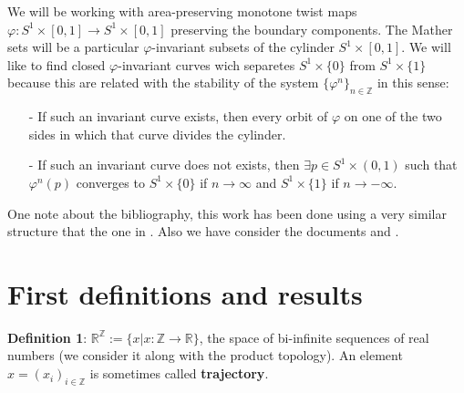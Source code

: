 \documentclass{article}
\begin{document}
	\noindent We will be working with area-preserving monotone twist maps $\varphi: S^{1} \times [0, 1] \rightarrow S^{1} \times [0, 1] $ preserving the boundary components. The Mather sets will be a particular $\varphi$-invariant subsets of the cylinder $S^{1} \times [0, 1]$. We will like to find closed $\varphi$-invariant curves wich separetes $S^{1} \times \{ 0 \}$ from $S^{1} \times \{ 1 \}$ because this are related with the stability of the system $\{ \varphi^{n} \}_{n \in \mathbb{Z}}$ in this sense:
	\begin{itemize}
		\item[-] If such an invariant curve exists, then every orbit of $\varphi$ on one of the two sides in which that curve divides the cylinder.
		\item[-] If such an invariant curve does not exists, then $\exists p \in S^{1} \times (0, 1)$ such that $\varphi^{n} (p)$ converges to $S^{1} \times \{ 0 \}$  if $n \rightarrow \infty$ and $S^{1} \times \{ 1 \}$ if $n \rightarrow - \infty$.
	\end{itemize}
	



	\noindent One note about the bibliography, this work has been done using a very similar structure that the one in 	\cite{R1}. Also we have consider the documents \cite{R2} and \cite{R3}.
		
		
		
	

	
		
	


\section{First definitions and results}
		
\noindent \textbf{Definition 1}: $\mathbb{R}^{\mathbb{Z}} := \{ x | x: \mathbb{Z} \rightarrow \mathbb{R}  \}$, the space of bi-infinite sequences of real numbers (we consider it along with the product topology). An element $x = (x_{i})_{i \in \mathbb{Z}}$ is sometimes called \textbf{trajectory}.
\end{document}
